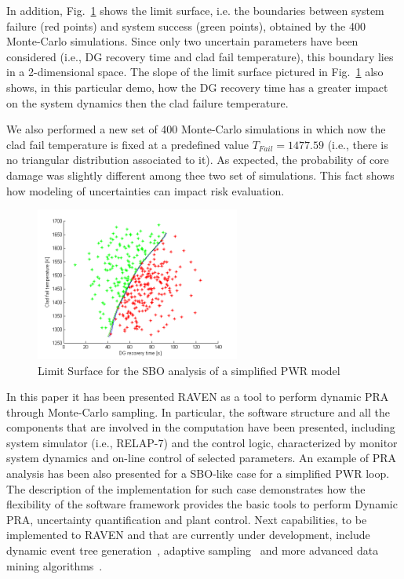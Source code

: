 \documentclass{mc2013}
\begin{document}
In addition, Fig.~\ref{fig:limit_surface_rng_temp_and_dg} shows the limit surface, i.e. the boundaries between system failure (red points) and system success (green points), obtained by the 400 Monte-Carlo simulations. Since only two uncertain parameters have been considered (i.e., DG recovery time and clad fail temperature), this boundary lies in a 2-dimensional space.
The slope of the limit surface pictured in Fig.~\ref{fig:limit_surface_rng_temp_and_dg} also shows, in this particular demo, how the DG recovery time has a greater impact on the system dynamics then the clad failure temperature.

We also performed a new set of 400 Monte-Carlo simulations in which now the clad fail temperature is fixed at a predefined value $T_{Fail}=1477.59$ (i.e., there is no triangular distribution associated to it). As expected, the probability of core damage was slightly different among thee two set of simulations. This fact shows how modeling of uncertainties can impact risk evaluation.

\begin{figure}
   \centering
    \includegraphics[width=0.6\textwidth]{figures/PRA_limitSurface.png}
    \caption{Limit Surface for the SBO analysis of a simplified PWR model}
    \label{fig:limit_surface_rng_temp_and_dg}
\end{figure}
In this paper it has been presented RAVEN as a tool to perform dynamic PRA through Monte-Carlo sampling. In particular, the software structure and all the components that are involved in the computation have been presented, including system simulator (i.e., RELAP-7) and the control logic, characterized by monitor system dynamics and on-line control of selected parameters.
An example of PRA analysis has been also presented for a SBO-like case for a simplified PWR loop. 
The description of the implementation for such case demonstrates how the flexibility of the software framework provides the basic tools to perform Dynamic PRA, uncertainty quantification and plant control. 
Next capabilities, to be implemented to RAVEN and that are currently under development, include dynamic event tree generation~\cite{ADAPTHakobyan}, adaptive sampling~\cite{mandelliSVMANS} and more advanced data mining algorithms~\cite{mandelliEsrel2011}. 



\end{document}
